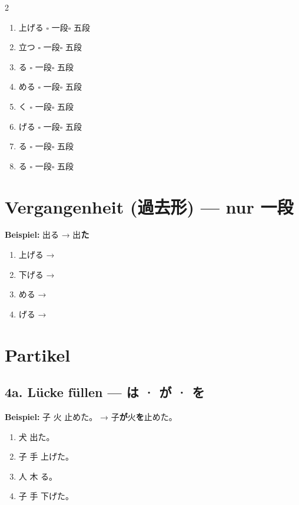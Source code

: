 \documentclass[11pt,a4paper,DIV=12]{scrartcl}
\begin{document}
\begin{multicols}{2}
\begin{enumerate}[itemsep=7pt]
\item 上げる \quad $\square$ 一段\quad $\square$ 五段
\item 立つ \quad $\square$ 一段\quad $\square$ 五段
\item {}る \quad $\square$ 一段\quad $\square$ 五段
\item {}める \quad $\square$ 一段\quad $\square$ 五段
\item {}く \quad $\square$ 一段\quad $\square$ 五段
\item {}げる \quad $\square$ 一段\quad $\square$ 五段
\item {}る \quad $\square$ 一段\quad $\square$ 五段
\item {}る \quad $\square$ 一段\quad $\square$ 五段
\end{enumerate}
\end{multicols}

\section{Vergangenheit (過去形) — nur 一段}

\textbf{Beispiel:} 出る → 出\textbf{た}

\begin{enumerate}[itemsep=6pt]
\item 上げる → \lin[4cm]
\item 下げる → \lin[4cm]
\item {}める → \lin[4cm]
\item {}げる → \lin[4cm]
\end{enumerate}

\section{Partikel}

\subsection*{4a. Lücke füllen — は · が · を}

\textbf{Beispiel:} 子 \lin[0.8cm] 火 \lin[0.8cm] 止めた。 → 子\textbf{が}火\textbf{を}止めた。

\begin{enumerate}[itemsep=8pt]
\item 犬 \lin[0.8cm] 出た。
\item 子 \lin[0.8cm] 手 \lin[0.8cm] 上げた。
\item 人 \lin[0.8cm] 木 \lin[0.8cm] る。
\item 子 \lin[0.8cm] 手 \lin[0.8cm] 下げた。
\end{enumerate}
\end{document}
